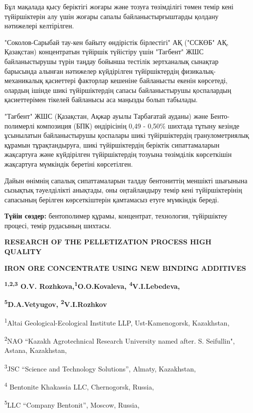 Бұл мақалада қысу беріктігі жоғары және тозуға төзімділігі төмен темір
кені түйіршіктерін алу үшін жоғары сапалы байланыстырғыштарды қолдану
нәтижелері келтірілген.

"Соколов-Сарыбай тау-кен байыту өндірістік бірлестігі" АҚ ("ССКӨБ" АҚ,
Қазақстан) концентратын түйіршік түйістіру үшін "Тагбент" ЖШС
байланыстырушы түрін таңдау бойынша тестілік зертханалық сынақтар
барысында алынған нәтижелер күйдірілген түйіршіктердің
физикалық-механикалық қасиеттері факторлар кешеніне байланысты екенін
көрсетеді, олардың ішінде шикі түйіршіктердің сапасы байланыстырушы
қоспалардың қасиеттерімен тікелей байланысы аса маңызды болып табылады.

"Тағбент" ЖШС (Қазақстан, Ақжар ауылы Тарбағатай ауданы) және
Бенто-полимерлі композиция (БПК) өндірісінің 0,49 - 0,50\% шихтада
тұтыну кезінде ұсынылатын байланыстырушы қоспалары шикі түйіршіктердің
гранулометриялық құрамын тұрақтандыруға, шикі түйіршіктердің беріктік
сипаттамаларын жақсартуға және күйдірілген түйіршіктердің тозуына
төзімділік көрсеткішін жақсартуға мүмкіндік беретіні көрсетілген.

Дайын өнімнің сапалық сипаттамаларын талдау бентониттің меншікті
шығынына сызықтық тәуелділікті анықтады, оны оңтайландыру темір кені
түйіршіктерінің сапасының берілген көрсеткіштерін қамтамасыз етуге
мүмкіндік береді.

{\bfseries Түйін сөздер:} бентополимер құрамы, концентрат, технология,
түйіршіктеу процесі, темір рудасының шихтасы.

{\bfseries RESEARCH OF THE PELLETIZATION PROCESS HIGH QUALITY}

{\bfseries IRON ORE CONCENTRATE USING NEW BINDING ADDITIVES}

{\bfseries \textsuperscript{1,2,3} O.V.
Rozhkova\textsuperscript{\envelope },\textsuperscript{1}O.O.Kovaleva,
\textsuperscript{4}V.I.Lebedeva,}

{\bfseries \textsuperscript{5}D.A.Vetyugov, \textsuperscript{2}V.I.Rozhkov}

\textsuperscript{1}Altai Geological-Ecological Institute LLP,
Ust-Kamenogorsk, Kazakhstan,

\textsuperscript{2}NAO ``Kazakh Agrotechnical Research University named
after. S. Seifullin", Astana, Kazakhstan,

\textsuperscript{3}JSC ``Science and Technology Solutions'', Almaty,
Kazakhstan,

\textsuperscript{4} Bentonite Khakassia LLC, Chernogorsk, Russia,

\textsuperscript{5}LLC ``Company Bentonit'', Moscow, Russia,

